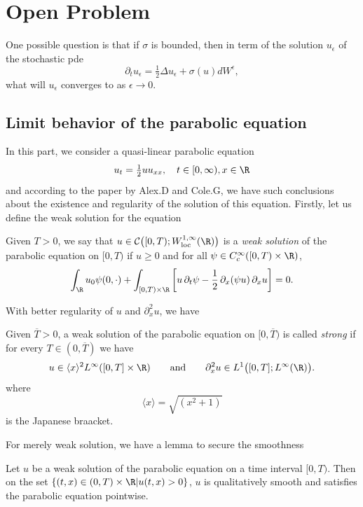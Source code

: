 \section{Open Problem}

One possible question is that if $\sigma$ is bounded, then in term of the solution $u_{\epsilon}$ of the stochastic pde
\[
\partial_t u_{\epsilon} = \tfrac{1}{2}\Delta u_{\epsilon} + \sigma(u)dW^{\epsilon},
\]
what will $u_{\epsilon}$ converges to as $\epsilon \to 0$.

\subsection{Limit behavior of the parabolic equation}

In this part, we consider a quasi-linear parabolic equation
\[
u_t = \tfrac12 uu_{xx},\quad t\in [0,\infty),x\in\R
\]
and according to the paper by Alex.D and Cole.G, we have such conclusions about the existence and regularity of the solution of this equation. Firstly, let us define the weak solution for the equation

\begin{definition}
Given $T>0$, we say that
\(
u \in \mathcal{C}\big([0,T);W^{1,\infty}_{\mathrm{loc}}(\R)\big)
\)
is a \emph{weak solution} of the parabolic equation on $[0,T)$ if $u\ge 0$ and for all
$\psi\in C_c^{\infty}([0,T)\times \R)$,
\begin{equation}
\int_{\R} u_0\psi(0,\cdot)
+ \int_{[0,T)\times\R}
\left[u\,\partial_t\psi - \frac12 \,\partial_x(\psi u)\,\partial_x u\right] = 0.
\label{eq:weak}
\end{equation}
\end{definition}

With better regularity of $u$ and $\partial_x^2 u$, we have

\begin{definition}
Given $\overline T>0$, a weak solution of the parabolic equation on $[0,\overline T)$ is called
\emph{strong} if for every $T\in (0,\overline T)$ we have
\[
u \in \langle x\rangle^{2}L^{\infty}([0,T]\times\R)
\qquad\text{and}\qquad
\partial_x^2 u \in L^1\big([0,T];L^{\infty}(\R)\big).
\]
where
\[
\langle x\rangle = \sqrt{(x^2+1)}
\]
is the Japanese braacket.
\end{definition}

For merely weak solution, we have a lemma to secure the smoothness

\begin{lemma}
    Let $u$ be a weak solution of the parabolic equation on a time interval $[0,  T)$. Then on the set $\{(t, x) \in (0, T) \times \R | u(t,x) > 0\}$, $u$  is qualitatively smooth and satisfies the parabolic equation pointwise.
\end{lemma}

